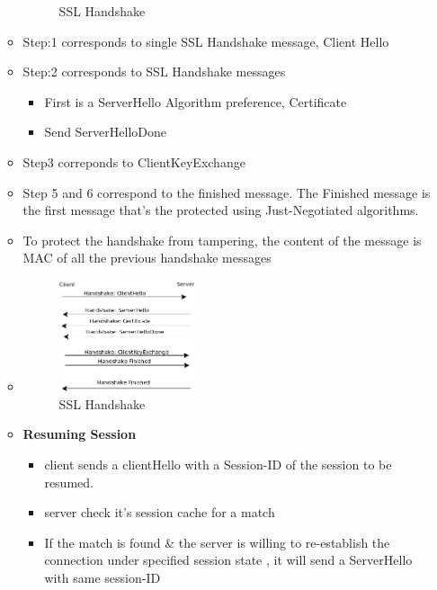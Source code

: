 \documentclass[12pt]{report}
\begin{document}
\begin{itemize}
\begin{itemize}
\begin{figure}[ht!]
                        \caption{SSL Handshake}
                      \end{figure}
                \item Step:1 corresponds to single SSL Handshake message, Client Hello
                \item Step:2 corresponds to SSL Handshake messages
                    \begin{itemize}
                        \item First is a ServerHello { Algorithm preference, Certificate }
                        \item Send ServerHelloDone
                    \end{itemize}
                \item Step3 correponds to ClientKeyExchange
                \item Step 5 and 6 correspond to the finished message. The Finished message is the first
                    message that's the protected using Just-Negotiated algorithms.
                \item To protect the handshake from tampering, the content of the message is MAC of 
                    all the previous handshake messages
                \item \begin{figure}[ht!]
                        \centering
                        \includegraphics[width=40mm]{Images/sslhandshake2.png}
                        \caption{SSL Handshake}
                      \end{figure}
                \item \textbf{Resuming Session}
                    \begin{itemize}
                        \item client sends a clientHello with a Session-ID of the session to be resumed.
                        \item server check it's session cache for a match
                        \item If the match is found \& the server is willing to re-establish the connection under specified
                            session state , it will send a ServerHello with same session-ID

\end{itemize}
\end{itemize}
\end{itemize}
\end{document}
